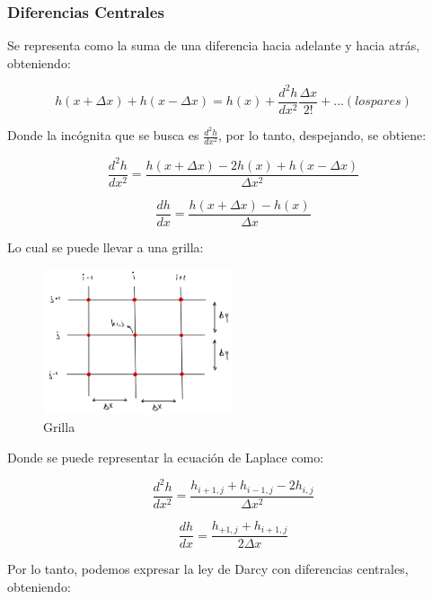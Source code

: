 \subsubsection{Diferencias Centrales}

Se representa como la suma de una diferencia hacia adelante y hacia atrás, obteniendo:

\begin{equation}
    h(x + \Delta x) + h(x - \Delta x) = h(x) + \frac{d^2h}{dx^2}\frac{\Delta x}{2!} + ...(los pares)
\end{equation}

Donde la incógnita que se busca es $\frac{d^2h}{dx^2}$, por lo tanto, despejando, se obtiene:

\begin{equation}
    \frac{d^2h}{dx^2} = \frac{h(x + \Delta x) - 2h(x) + h(x - \Delta x)}{\Delta x^2}
\end{equation}

\begin{equation}
    \frac{dh}{dx} = \frac{h(x + \Delta x) - h(x)}{\Delta x}
\end{equation}

Lo cual se puede llevar a una grilla:

\begin{figure}[H]
    \centering
    \includegraphics[width=0.5\textwidth]{FOTOS/grilla.jpg}
    \caption{Grilla}
\end{figure}

Donde se puede representar la ecuación de Laplace como:

\begin{equation}
    \frac{d^2h}{dx^2} = \frac{h_{i+1,j} + h_{i-1,j} - 2h_{i,j}}{\Delta x^2}
\end{equation}

\begin{equation}
    \frac{dh}{dx} = \frac{h_{+1,j} + h_{i+1,j}}{2\Delta x}
\end{equation}

Por lo tanto, podemos expresar la ley de Darcy con diferencias centrales, obteniendo:

